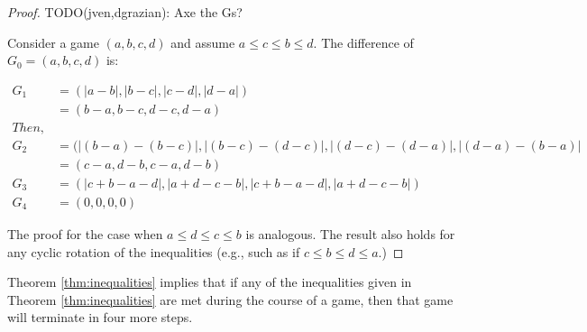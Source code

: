 \documentclass[12pt]{amsart}
\begin{document}
\begin{proof}

TODO(jven,dgrazian): Axe the Gs?

Consider a game $(a,b,c,d)$ and assume $a \leq c \leq b \leq d$. The difference of $G_0 =  (a, b, c, d)$ is:

\begin{align*}
G_1 &= (|a-b|, |b-c|, |c-d|, |d-a|) \\
&=(b-a, b-c, d-c, d-a)\\
Then, \\
G_2 &= (|(b-a) - (b-c)|, |(b-c) - (d-c)|, |(d-c) - (d-a)|, |(d-a) - (b-a)| \\
&= (c-a, d-b, c-a, d-b)\\
G_3 &= (|c + b - a - d|, |a + d - c - b|, |c + b - a - d|, |a + d - c - b|)\\
G_4 &= (0,0,0,0)
\end{align*}

The proof for the case when $a \leq d \leq c \leq b$ is analogous. The result also holds for any cyclic rotation of the inequalities (e.g., such as if $c \leq b \leq d \leq a$.)
\end{proof}

Theorem \ref{thm:inequalities} implies that if any of the inequalities given in Theorem \ref{thm:inequalities} are met during the course of a game, then that game will terminate in four more steps.
\end{document}
